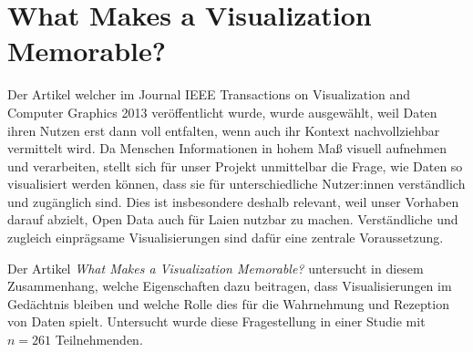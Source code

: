 \section{What Makes a Visualization Memorable?}

Der Artikel welcher im Journal IEEE Transactions on Visualization and Computer Graphics 2013 veröffentlicht wurde, wurde ausgewählt, weil Daten ihren Nutzen erst dann voll entfalten, wenn auch ihr Kontext nachvollziehbar vermittelt wird. Da Menschen Informationen in hohem Maß visuell aufnehmen und verarbeiten, stellt sich für unser Projekt unmittelbar die Frage, wie Daten so visualisiert werden können, dass sie für unterschiedliche Nutzer:innen verständlich und zugänglich sind. Dies ist insbesondere deshalb relevant, weil unser Vorhaben darauf abzielt, Open Data auch für Laien nutzbar zu machen. Verständliche und zugleich einprägsame Visualisierungen sind dafür eine zentrale Voraussetzung.

Der Artikel \textit{What Makes a Visualization Memorable?} untersucht in diesem Zusammenhang, welche Eigenschaften dazu beitragen, dass Visualisierungen im Gedächtnis bleiben und welche Rolle dies für die Wahrnehmung und Rezeption von Daten spielt. Untersucht wurde diese Fragestellung in einer Studie mit $n = 261$ Teilnehmenden. \cite{Visualization}

\smallskip
\noindent
